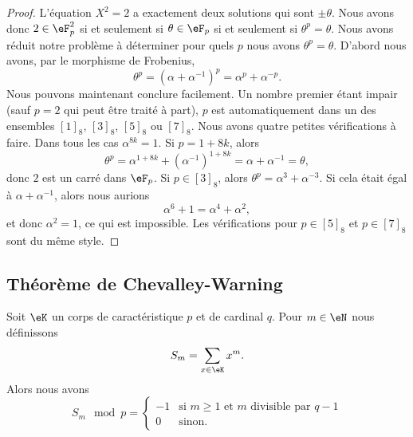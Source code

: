 \begin{proof}
    L'équation \( X^2=2\) a exactement deux solutions qui sont \( \pm\theta\). Nous avons donc \( 2\in \eF_p^2\) si et seulement si \( \theta\in \eF_p\) si et seulement si \( \theta^p=\theta\). Nous avons réduit notre problème à déterminer pour quels \( p\) nous avons \( \theta^p=\theta\). D'abord nous avons, par le morphisme de Frobenius,
    \begin{equation}
        \theta^p=(\alpha+\alpha^{-1})^p=\alpha^p+\alpha^{-p}.
    \end{equation}
    Nous pouvons maintenant conclure facilement. Un nombre premier étant impair (sauf \( p=2\) qui peut être traité à part), \( p\) est automatiquement dans un des ensembles \( [1]_8\), \( [3]_8\), \( [5]_8\) ou \( [7]_8\). Nous avons quatre petites vérifications à faire. Dans tous les cas \( \alpha^{8k}=1\). Si \( p=1+8k\), alors
    \begin{equation}
        \theta^p=\alpha^{1+8k}+(\alpha^{-1})^{1+8k}=\alpha+\alpha^{-1}=\theta,
    \end{equation}
    donc \( 2\) est un carré dans \( \eF_p\). Si \( p\in[3]_8\), alors \( \theta^p=\alpha^3+\alpha^{-3}\). Si cela était égal à \( \alpha+\alpha^{-1}\), alors nous aurions
    \begin{equation}
        \alpha^6+1=\alpha^4+\alpha^2,
    \end{equation}
    et donc \( \alpha^2=1\), ce qui est impossible. Les vérifications pour \( p\in [5]_8\) et \( p\in [7]_8\) sont du même style.

\end{proof}

\subsection{Théorème de Chevalley-Warning}

\begin{lemma}
    Soit \( \eK\) un corps de caractéristique \( p\) et de cardinal \( q\). Pour \( m\in \eN\) nous définissons
    \begin{equation}
        S_m=\sum_{x\in \eK}x^m.
    \end{equation}
    Alors nous avons
    \begin{equation}
        S_m\mod p=\begin{cases}
            -1     &   \text{si } m\geq 1\text{ et } m\text{ divisible par } q-1\\
            0    &    \text{sinon}.
        \end{cases}
    \end{equation}
\end{lemma}

